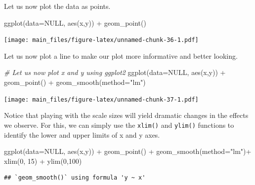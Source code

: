 \documentclass[
]{book}
\newenvironment{Shaded}{\begin{snugshade}}{\end{snugshade}}
\newcommand{\AttributeTok}[1]{\textcolor[rgb]{0.77,0.63,0.00}{#1}}
\newcommand{\CommentTok}[1]{\textcolor[rgb]{0.56,0.35,0.01}{\textit{#1}}}
\newcommand{\ConstantTok}[1]{\textcolor[rgb]{0.00,0.00,0.00}{#1}}
\newcommand{\DecValTok}[1]{\textcolor[rgb]{0.00,0.00,0.81}{#1}}
\newcommand{\FunctionTok}[1]{\textcolor[rgb]{0.00,0.00,0.00}{#1}}
\newcommand{\NormalTok}[1]{#1}
\newcommand{\SpecialCharTok}[1]{\textcolor[rgb]{0.00,0.00,0.00}{#1}}
\newcommand{\StringTok}[1]{\textcolor[rgb]{0.31,0.60,0.02}{#1}}
\begin{document}
Let us now plot the data as points.

\begin{Shaded}
\begin{Highlighting}[]
\FunctionTok{ggplot}\NormalTok{(}\AttributeTok{data=}\ConstantTok{NULL}\NormalTok{, }\FunctionTok{aes}\NormalTok{(x,y)) }\SpecialCharTok{+}
  \FunctionTok{geom\_point}\NormalTok{()}
\end{Highlighting}
\end{Shaded}

\texttt{[image: main\_files/figure-latex/unnamed-chunk-36-1.pdf]}

Let us now plot a line to make our plot more informative and better looking.

\begin{Shaded}
\begin{Highlighting}[]
\CommentTok{\# Let us now plot x and y using ggplot2}
\FunctionTok{ggplot}\NormalTok{(}\AttributeTok{data=}\ConstantTok{NULL}\NormalTok{, }\FunctionTok{aes}\NormalTok{(x,y)) }\SpecialCharTok{+}
  \FunctionTok{geom\_point}\NormalTok{() }\SpecialCharTok{+}
  \FunctionTok{geom\_smooth}\NormalTok{(}\AttributeTok{method=}\StringTok{"lm"}\NormalTok{)}
\end{Highlighting}
\end{Shaded}

\texttt{[image: main\_files/figure-latex/unnamed-chunk-37-1.pdf]}

Notice that playing with the scale sizes will yield dramatic changes in the effects we observe. For this, we can simply use the \texttt{xlim()} and \texttt{ylim()} functions to identify the lower and upper limits of x and y axes.

\begin{Shaded}
\begin{Highlighting}[]
\FunctionTok{ggplot}\NormalTok{(}\AttributeTok{data=}\ConstantTok{NULL}\NormalTok{, }\FunctionTok{aes}\NormalTok{(x,y)) }\SpecialCharTok{+}
  \FunctionTok{geom\_point}\NormalTok{() }\SpecialCharTok{+}
  \FunctionTok{geom\_smooth}\NormalTok{(}\AttributeTok{method=}\StringTok{"lm"}\NormalTok{)}\SpecialCharTok{+}
  \FunctionTok{xlim}\NormalTok{(}\DecValTok{0}\NormalTok{, }\DecValTok{15}\NormalTok{) }\SpecialCharTok{+}
  \FunctionTok{ylim}\NormalTok{(}\DecValTok{0}\NormalTok{,}\DecValTok{100}\NormalTok{)}
\end{Highlighting}
\end{Shaded}

\begin{verbatim}
## `geom_smooth()` using formula 'y ~ x'
\end{verbatim}
\end{document}

